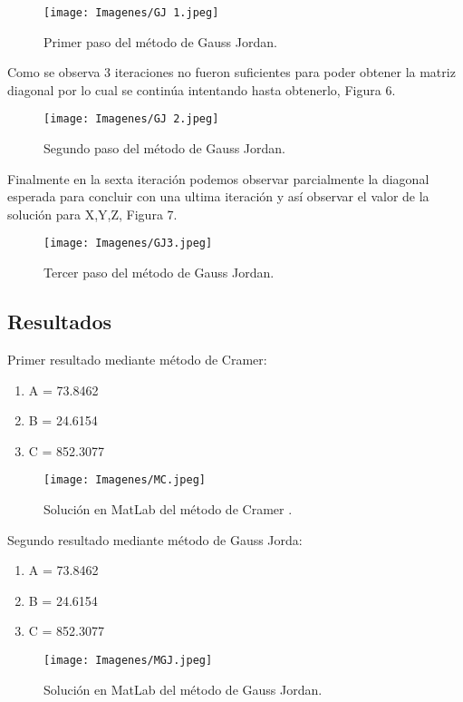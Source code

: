 \documentclass[fleqn,10pt]{olplainarticle}
\begin{document}
\begin{figure}[h!]
\centering
\texttt{[image: Imagenes/GJ 1.jpeg]}
\caption{Primer paso del método de Gauss Jordan.}
\end{figure}

Como se observa 3 iteraciones no fueron suficientes para poder obtener la matriz diagonal por lo cual se continúa intentando hasta obtenerlo, Figura 6.

\begin{figure}[h!]
\centering
\texttt{[image: Imagenes/GJ 2.jpeg]}
\caption{Segundo paso del método de Gauss Jordan.}
\end{figure}

Finalmente en la sexta iteración podemos observar parcialmente la diagonal esperada para concluir con una ultima iteración y así observar el valor de la solución para X,Y,Z, Figura 7.   

\begin{figure}[h!]
\centering
\texttt{[image: Imagenes/GJ3.jpeg]}
\caption{Tercer paso del método de Gauss Jordan.}
\end{figure}

\subsection*{Resultados}

Primer resultado mediante método de Cramer:

\begin{enumerate}[noitemsep] 
\item A = 73.8462
\item B = 24.6154
\item C = 852.3077
\end{enumerate}

\begin{figure}[h!]
\centering
\texttt{[image: Imagenes/MC.jpeg]}
\caption{Solución en MatLab del método de Cramer .}
\end{figure}

Segundo resultado mediante método de Gauss Jorda:

\begin{enumerate}[noitemsep] 
\item A = 73.8462
\item B = 24.6154
\item C = 852.3077
\end{enumerate}

\begin{figure}[h!]
\centering
\texttt{[image: Imagenes/MGJ.jpeg]}
\caption{Solución en MatLab del método de Gauss Jordan.}
\end{figure}
\end{document}
